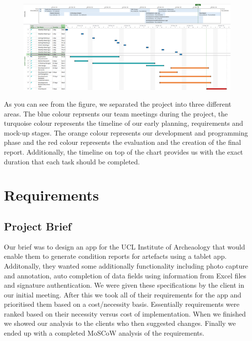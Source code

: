 \documentclass[12pt]{article}
\begin{document}
\begin{figure}[h]
\begin{center}
\includegraphics[width=1.0\textwidth]{ArcheoReportGantt}
\end{center}
\end{figure}

As you can see from the figure, we separated the project into three different areas. The blue colour reprsents our team meetings during the project, the turquoise colour represents the timeline of our early planning, requirements and mock-up stages. The orange colour represents our development and programming phase and the red colour represents the evaluation and the creation of the final report. Additionally, the timeline on top of the chart provides us with the exact duration that each task should be completed. 

\newpage
\section{Requirements}
\subsection{Project Brief}
Our brief was to design an app for the UCL Institute of Archeaology that would enable them to generate condition reports for artefacts using a tablet app. Additonally, they wanted some additionally functionality including photo capture and annotation, auto completion of data fields using information from Excel files and signature authentication. We were given these specifications by the client in our initial meeting. After this we took all of their requirements for the app and prioritised them based on a cost/necessity basis. Essentially requirements were ranked based on their necessity versus cost of implementation. When we finished we showed our analysis to the clients who then suggested changes. Finally we ended up with a completed MoSCoW analysis of the requirements.
\end{document}
